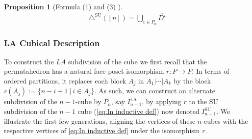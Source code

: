 \documentclass{amsart}
\newtheorem{proposition}[theorem]{Proposition}
\theoremstyle{definition}
\newcommand{\SU}{\mathrm{SU}}
\newcommand{\LA}{\mathrm{LA}}
\newcommand{\SUD}{\triangle^{\mathrm{SU}}}
\newcommand{\maxsubdivpairsv}{\overline{D^v}}
\begin{document}
\begin{proposition}[Formula (1) and (3) \cite{saneblidzeComparingDiagonalsAssociahedra2022}]
\begin{align*}
    \SUD([n]) = \bigcup_{v \in P_n} \maxsubdivpairsv
\end{align*}
\end{proposition}

\subsubsection{LA Cubical Description}

To construct the $LA$ subdivision of the cube we first recall that the permutahedron has a natural face poset isomorphism $r:P\to P$. 
In terms of ordered partitions, it replaces each block $A_j$ in $A_1 | \cdots | A_k$ by the block $r(A_j):=\{n-i+1 \ | \ i \in A_j\}$.
As such, we can construct an alternate subdivision of the $n-1$-cube by $P_n$, say $I_{n-1}^{\LA}$, by applying $r$ to the $\SU$ subdivision of the $n-1$ cube (\cref{eq:In inductive def})
now denoted $I_{n-1}^{\SU}$.
We illustrate the first few generations, aligning the vertices of these $n$-cubes with the respective vertices of \cref{eq:In inductive def} under the isomorphism $r$.
\end{document}
